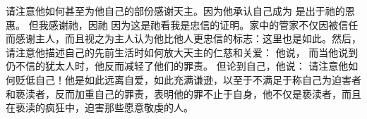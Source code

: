  请注意他如何甚至为他自己的部份感谢天主。因为他承认自己成为 是出于祂的恩惠。 但我感谢祂，因祂 因为这是祂看我是忠信的证明。家中的管家不仅因被信任而感谢主人，而且视之为主人认为他比他人更忠信的标志：这里也是如此。然后，请注意他描述自己的先前生活时如何放大天主的仁慈和关爱： 他说， 而当他说到仍不信的犹太人时，他反而减轻了他们的罪责。  但论到自己，他说： 请注意他如何贬低自己！他是如此远离自爱，如此充满谦逊，以至于不满足于称自己为迫害者和亵渎者，反而加重自己的罪责，表明他的罪不止于自身，他不仅是亵渎者，而且在亵渎的疯狂中，迫害那些愿意敬虔的人。\par

\par

